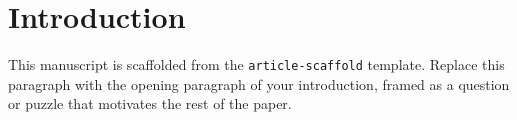 \section{Introduction}
\label{sec:introduction}

%
%

This manuscript is scaffolded from the \texttt{article-scaffold} template.
Replace this paragraph with the opening paragraph of your introduction,
framed as a question or puzzle that motivates the rest of the paper.
